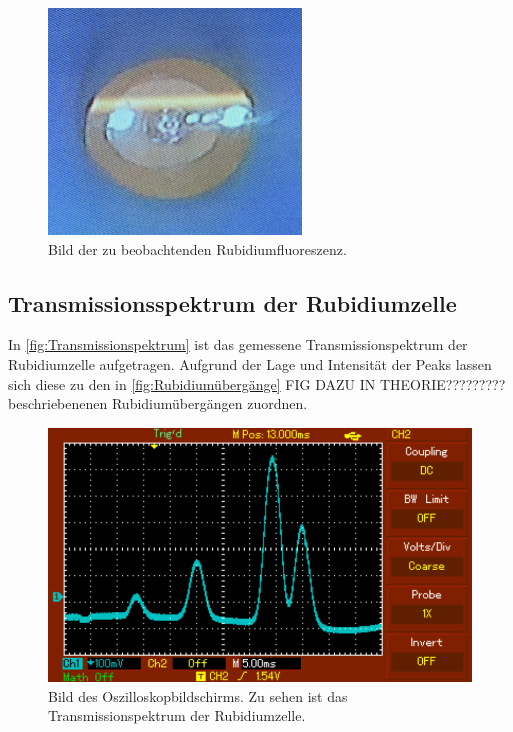 \begin{figure}
    \centering
    \includegraphics{content/pics/Fluoreszenz.png}
    \caption{Bild der zu beobachtenden Rubidiumfluoreszenz.}
    \label{fig:Rubidiumfluoreszenz}
\end{figure}

\subsection{Transmissionsspektrum der Rubidiumzelle}
In \autoref{fig:Transmissionspektrum} ist das gemessene Transmissionspektrum der Rubidiumzelle aufgetragen. Aufgrund der Lage und Intensität der Peaks
lassen sich diese zu den in \autoref{fig:Rubidiumübergänge} FIG DAZU IN THEORIE????????? beschriebenenen Rubidiumübergängen zuordnen.

\begin{figure}
    \centering
    \includegraphics{content/pics/Peaks.pdf}
    \caption{Bild des Oszilloskopbildschirms. Zu sehen ist das Transmissionspektrum der Rubidiumzelle.}
    \label{fig:Rubidiumfluoreszenz}
\end{figure}
